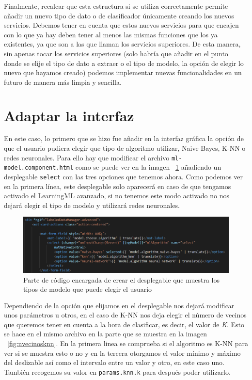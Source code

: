\documentclass[a4paper, 12pt]{book}
\begin{document}
Finalmente, recalcar que esta estructura si se utiliza correctamente permite añadir un nuevo tipo de dato o de clasificador únicamente creando los nuevos servicios. Debemos tener en cuenta que estos nuevos servicios para que encajen con lo que ya hay deben tener al menos las mismas funciones que los ya existentes, ya que son a las que llaman los servicios superiores. De esta manera, sin apenas tocar los servicios superiores (solo habría que añadir en el punto donde se elije el tipo de dato a extraer o el tipo de modelo, la opción de elegir lo nuevo que hayamos creado) podemos implementar nuevas funcionalidades en un futuro de manera más limpia y sencilla.



\section{Adaptar la interfaz} 
\label{sec:interfaz}

En este caso, lo primero que se hizo fue añadir en la interfaz gráfica la opción de que el usuario pudiera elegir que tipo de algoritmo utilizar, Naive Bayes, K-NN o redes neuronales. Para ello hay que modificar el archivo \texttt{ml-model.component.html} como se puede ver en la imagen ~\ref{fig:desplegable} añadiendo un desplegable \texttt{select} con las tres opciones que tenemos ahora. Como podemos ver en la primera línea, este desplegable solo aparecerá en caso de que tengamos activado el LearningML avanzado, si no tenemos este modo activado no nos dejará elegir el tipo de modelo y utilizará redes neuronales.\\

\begin{figure}
	\centering
	\includegraphics[width=12cm, keepaspectratio]{img/desplegable}
	\caption{Parte de código encargada de crear el desplegable que muestra los tipos de modelo que puede elegir el usuario}									\label{fig:desplegable}
\end{figure}

Dependiendo de la opción que elijamos en el desplegable nos dejará modificar unos parámetros u otros, en el caso de K-NN nos deja elegir el número de vecinos que queremos tener en cuenta a la hora de clasificar, es decir, el valor de \emph{K}. Esto se hace en el mismo archivo en la parte que se muestra en la imagen ~\ref{fig:nvecinosknn}. En la primera linea se comprueba si el algoritmo es K-NN para ver si se muestra esto o no y en la tercera otorgamos el valor mínimo y máximo del deslizable así como el intervalo entre un valor y otro, en este caso uno. También recogemos su valor en \texttt{params.knn.k} para después poder utilizarlo.
\end{document}
